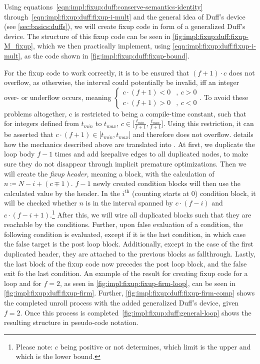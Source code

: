 Using equations~\ref{eqn:impl:fixup:duff:conserve-semantics-identity} through~\ref{eqn:impl:fixup:duff:fixup-i-mult} and the general idea of Duff's device (see \cref{sec:basics:duffs}), we will create fixup code in form of a generalized Duff's device.
The structure of this fixup code can be seen in \cref{fig:impl:fixup:duff:fixup-M_fixup}, which we then practically implement, using \cref{eqn:impl:fixup:duff:fixup-i-mult}, as the code shown in \cref{fig:impl:fixup:duff:fixup-bound}.





For the fixup code to work correctly, it is to be ensured that $(f + 1) \cdot c$ does not overflow, as otherwise, the interval \cinterval could potentially be invalid, iff an integer over- or underflow occurs, meaning $
\begin{cases}
    c \cdot (f + 1) < 0 &, \medspace c > 0\\
    c \cdot (f + 1) > 0 &, \medspace c < 0
\end{cases}$.
To avoid these problems altogether, c is restricted to being a compile-time constant, such that for integers defined from $t_{min}$ to $t_{max}$, $c \in \lbrack \frac{t_{min}}{f + 1}, \frac{t_{max}}{f + 1} \rbrack$.
Using this restriction, it can be asserted that $c \cdot (f + 1) \in \lbrack t_{min}, t_{max} \rbrack$ and therefore does not overflow.
 details how the mechanics described above are translated into \libFIRM.
At first, we duplicate the loop body $f - 1$ times and add keepalive edges to all duplicated nodes, to make sure they do not disappear through implicit premature optimizations.
Then we will create the \textit{fixup header}, meaning a block, with the calculation of $n \coloneq N - i + (c \mp 1)$.
$f - 1$ newly created condition blocks will then use the calculated value by the header.
In the $i^{\text{th}}$ (counting starts at 0) condition block, it will be checked whether $n$ is in the interval spanned by $c \cdot (f - i)$ and  $c \cdot (f - i + 1)$.\footnote{Please note: $c$ being positive or not determines, which limit is the upper and which is the lower bound.}
After this, we will wire all duplicated blocks such that they are reachable by the conditions.
Further, upon false evaluation of a condition, the following condition is evaluated, except if it is the last condition, in which case the false target is the post loop block.
Additionally, except in the case of the first duplicated header, they are attached to the previous blocks as fallthrough.
Lastly, the last block of the fixup code now precedes the post loop block, and the false exit fo the last condition.
An example of the result for creating fixup code for a loop and for $f = 2$, as seen in \cref{fig:impl:fixup:fixup-firm-loop}, can be seen in \cref{fig:impl:fixup:duff:fixup-firm}.
Further, \cref{fig:impl:fixup:duff:fixup-firm-comp} shows the completed unroll process with the added generalized Duff's device, given $f = 2$.
Once this process is completed~\cref{fig:impl:fixup:duff:general-loop} shows the resulting structure in pseudo-code notation.

